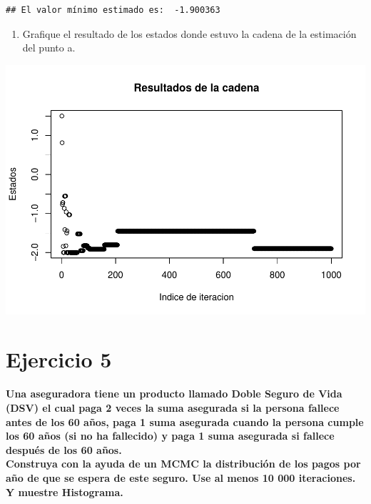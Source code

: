 \documentclass[
]{article}
\newenvironment{Shaded}{\begin{snugshade}}{\end{snugshade}}
\newcommand{\AttributeTok}[1]{\textcolor[rgb]{0.13,0.29,0.53}{#1}}
\newcommand{\FunctionTok}[1]{\textcolor[rgb]{0.13,0.29,0.53}{\textbf{#1}}}
\newcommand{\NormalTok}[1]{#1}
\newcommand{\SpecialCharTok}[1]{\textcolor[rgb]{0.81,0.36,0.00}{\textbf{#1}}}
\newcommand{\StringTok}[1]{\textcolor[rgb]{0.31,0.60,0.02}{#1}}
\providecommand{\tightlist}{%
  \setlength{\itemsep}{0pt}\setlength{\parskip}{0pt}}
\begin{document}
\begin{verbatim}
## El valor mínimo estimado es:  -1.900363
\end{verbatim}

\begin{enumerate}
\def\labelenumi{\alph{enumi}.}
\setcounter{enumi}{1}
\tightlist
\item
  Grafique el resultado de los estados donde estuvo la cadena de la
  estimación del punto a.
\end{enumerate}

\begin{Shaded}
\end{Shaded}

\includegraphics{tarea2_files/figure-latex/unnamed-chunk-15-1.pdf}

\newpage

\hypertarget{ejercicio-5}{%
\section{Ejercicio 5}\label{ejercicio-5}}

\textbf{Una aseguradora tiene un producto llamado Doble Seguro de Vida
(DSV) el cual paga 2 veces la suma asegurada si la persona fallece antes
de los 60 años, paga 1 suma asegurada cuando la persona cumple los 60
años (si no ha fallecido) y paga 1 suma asegurada si fallece después de
los 60 años.}\\
\textbf{Construya con la ayuda de un MCMC la distribución de los pagos
por año de que se espera de este seguro. Use al menos 10 000
iteraciones. Y muestre Histograma.}
\end{document}
